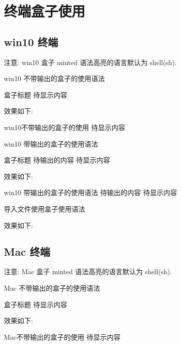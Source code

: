 \section{终端盒子使用} \label{sec:终端盒子使用}
  \subsection{win10 终端} \label{sbsec:win10 终端}
    注意: win10 盒子 minted 语法高亮的语言默认为 shell(sh).

      \begin{Code}[latex][][LaTeX]{win10 不带输出的盒子的使用语法}
        \begin{Win}[minted高亮的语言]{盒子标题}
          待显示内容
        \end{Win}
      \end{Code}
      效果如下:
      \begin{Win}{win10不带输出的盒子的使用}
        待显示内容
      \end{Win}

      \begin{Code}[LaTeX]{win10 带输出的盒子的使用语法}
        \begin{WinOutput}[minted高亮的语言]{盒子标题}{
          待输出的内容
        }
          待显示内容
        \end{WinOutput}
      \end{Code}
      效果如下:
      \begin{WinOutput}{win10 带输出的盒子的使用语法}{
        待输出的内容
      }
        待显示内容
      \end{WinOutput}

      \begin{Code}[LaTeX]{导入文件使用盒子使用语法}
      \end{Code}
      效果如下:

  \subsection{Mac 终端} \label{sbsec:Mac 终端}
    注意: Mac 盒子 minted 语法高亮的语言默认为 shell(sh).

      \begin{Code}[latex][][LaTeX]{Mac 不带输出的盒子的使用语法}
        \begin{Mac}[minted高亮的语言]{盒子标题}
          待显示内容
        \end{Mac}
      \end{Code}
      效果如下:
      \begin{Mac}{Mac不带输出的盒子的使用}
        待显示内容
      \end{Mac}

